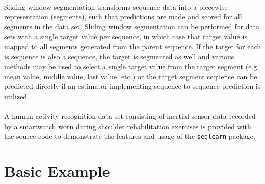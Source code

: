 \documentclass[twoside,11pt]{article}
\begin{document}
\paragraph{}
Sliding window segmentation transforms sequence data into a piecewise representation (segments), such that predictions are made and scored for all segments in the data set. Sliding window segmentation can be performed for data sets with a single target value per sequence, in which case that target value is mapped to all segments generated from the parent sequence. If the target for each is sequence is also a sequence, the target is segmented as well and various methods may be used to select a single target value from the target segment (e.g. mean value, middle value, last value, etc.) or the target segment sequence can be predicted directly if an estimator implementing sequence to sequence prediction is utilized.

\paragraph{}
A human activity recognition data set \citep{burns_shoulder_2018} consisting of inertial sensor data recorded by a smartwatch worn during shoulder rehabilitation exercises is provided with the source code to demonstrate the features and usage of the \texttt{seglearn} package. 

\section{Basic Example}
\end{document}
